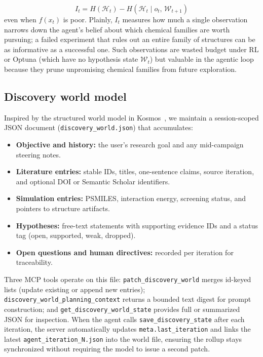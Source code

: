\documentclass[twocolumn]{fairmeta}
\begin{document}
\begin{equation}
I_t = H(\mathcal{H}_t) - H(\mathcal{H}_t \mid o_t,\, \mathcal{W}_{t+1})
\label{eq:infogain}
\end{equation}
even when $f(x_t)$ is poor.
Plainly, $I_t$ measures how much a single observation narrows down the agent's belief about which chemical families are worth pursuing; a failed experiment that rules out an entire family of structures can be as informative as a successful one.
Such observations are wasted budget under RL or Optuna (which have no hypothesis state $\mathcal{W}_t$) but valuable in the agentic loop because they prune unpromising chemical families from future exploration.

\subsection{Discovery world model}

Inspired by the structured world model in Kosmos~\cite{kosmos2025}, we maintain a session-scoped JSON document (\texttt{discovery\_world.json}) that accumulates:
\begin{itemize}
\item \textbf{Objective and history:} the user's research goal and any mid-campaign steering notes.
\item \textbf{Literature entries:} stable IDs, titles, one-sentence claims, source iteration, and optional DOI or Semantic Scholar identifiers.
\item \textbf{Simulation entries:} PSMILES, interaction energy, screening status, and pointers to structure artifacts.
\item \textbf{Hypotheses:} free-text statements with supporting evidence IDs and a status tag (open, supported, weak, dropped).
\item \textbf{Open questions and human directives:} recorded per iteration for traceability.
\end{itemize}
Three MCP tools operate on this file: \texttt{patch\_discovery\_world} merges id-keyed lists (update existing or append new entries); \texttt{discovery\_world\_planning\_context} returns a bounded text digest for prompt construction; and \texttt{get\_discovery\_world\_state} provides full or summarized JSON for inspection.
When the agent calls \texttt{save\_discovery\_state} after each iteration, the server automatically updates \texttt{meta.last\_iteration} and links the latest \texttt{agent\_iteration\_N.json} into the world file, ensuring the rollup stays synchronized without requiring the model to issue a second patch.
\end{document}
